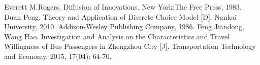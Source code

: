 \documentclass[12pt]{article}
\begin{document}
	
	
	\newpage
	\tableofcontents
	
	
	
	
	
	
	
	
	
	
	
	
	
	
	
	
	
	
	
	
	
	\begin{thebibliography}{99}
		 Everett M.Rogers. Diffusion of Innovations. New York:The Free Press, 1983.
		 Duan Peng. Theory and Application of Discrete Choice Model [D]. Nankai University, 2010.
		Addison-Wesley Publishing Company, 1986.
		 Feng Jiandong, Wang Hao. Investigation and Analysis on the Characteristics and Travel Willingness of Bus Passengers in Zhengzhou City [J]. Transportation Technology and Economy, 2015, 17(04): 64-70.
	\end{thebibliography}
	
	
	
	
	
	
	
\end{document}
